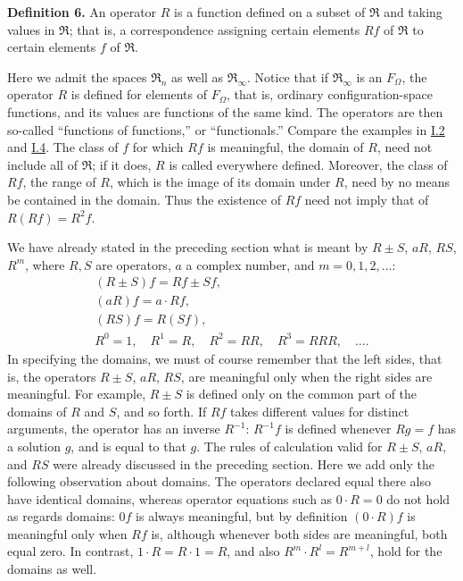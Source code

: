 \documentclass[fontsize=13pt,twoside,openany,headings=normal,parskip=false,bookmarkpackage=false,DIV=calc]{scrbook}
\begin{document}
\leavevmode{}\textbf{Definition 6.}\label{def:II.6} An operator $R$ is a function defined on a subset of $\mathfrak{R}$ and taking values in $\mathfrak{R}$; that is, a correspondence assigning certain elements $Rf$ of $\mathfrak{R}$ to certain elements $f$ of $\mathfrak{R}$.

Here we admit the spaces $\mathfrak{R}_n$ as well as $\mathfrak{R}_\infty$. Notice that if $\mathfrak{R}_\infty$ is an $F_\Omega$, the operator $R$ is defined for elements of $F_\Omega$, that is, ordinary configuration-space functions, and its values are functions of the same kind. The operators are then so-called ``functions of functions,'' or ``functionals.'' Compare the examples in \hyperref[sec:I.2]{I.2} and \hyperref[sec:I.4]{I.4}. The class of $f$ for which $Rf$ is meaningful, the domain of $R$, need not include all of $\mathfrak{R}$; if it does, $R$ is called everywhere defined. Moreover, the class of $Rf$, the range of $R$, which is the image of its domain under $R$, need by no means be contained in the domain. Thus the existence of $Rf$ need not imply that of $R(Rf)=R^2f$.

\hypertarget{origpage-47}{}%
We have already stated in the preceding section what is meant by $R\pm S$, $aR$, $RS$, $R^m$, where $R,S$ are operators, $a$ a complex number, and $m=0,1,2,\ldots$:
\begin{gather*}
(R\pm S)f=Rf\pm Sf,\\
(aR)f=a\cdot Rf,\\
(RS)f=R(Sf),\\
R^0=1,\quad R^1=R,\quad R^2=RR,\quad R^3=RRR,\quad\ldots.
\end{gather*}
In specifying the domains, we must of course remember that the left sides, that is, the operators $R\pm S$, $aR$, $RS$, are meaningful only when the right sides are meaningful. For example, $R\pm S$ is defined only on the common part of the domains of $R$ and $S$, and so forth. If $Rf$ takes different values for distinct arguments, the operator has an inverse $R^{-1}$: $R^{-1}f$ is defined whenever $Rg=f$ has a solution $g$, and is equal to that $g$. The rules of calculation valid for $R\pm S$, $aR$, and $RS$ were already discussed in the preceding section. Here we add only the following observation about domains. The operators declared equal there also have identical domains, whereas operator equations such as $0\cdot R=0$ do not hold as regards domains: $0f$ is always meaningful, but by definition $(0\cdot R)f$ is meaningful only when $Rf$ is, although whenever both sides are meaningful, both equal zero. In contrast, $1\cdot R=R\cdot1=R$, and also $R^m\cdot R^l=R^{m+l}$, hold for the domains as well.
\end{document}
